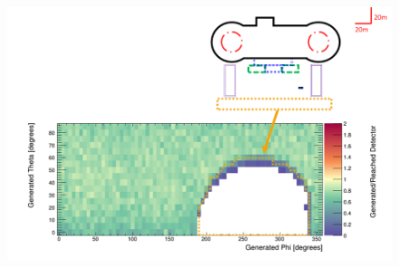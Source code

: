 \begin{figure}[htbp]
 \centering
 \includegraphics[width=\linewidth]{Chapter5/Figs/wylfaRasterNew/TurbineHallGen_Reached.png}
 \label{fig:TurbineHallGen_Reached}
\end{figure}





